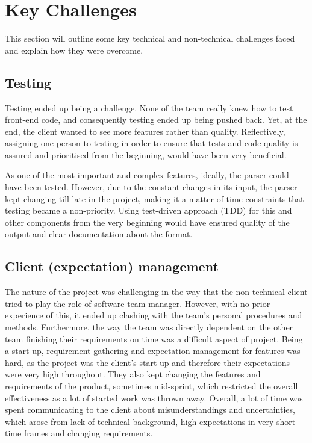 \documentclass{l3proj}
\begin{document}
\section{Key Challenges}
\label{sec:managing}

This section will outline some key technical and non-technical challenges faced and explain how they were overcome.

\subsection{Testing}
\label{subsec:testing}
Testing ended up being a challenge. None of the team really knew how to test front-end code, and consequently testing ended up being pushed back. Yet, at the end, the client wanted to see more features rather than quality. Reflectively, assigning one person to testing in order to ensure that tests and code quality is assured and prioritised from the beginning, would have been very beneficial.   

As one of the most important and complex features, ideally, the parser could have been tested. However, due to the constant changes in its input, the parser kept changing till late in the project, making it a matter of time constraints that testing became a non-priority. Using test-driven approach (TDD) for this and other components from the very beginning would have ensured quality of the output and clear documentation about the format.

\subsection{Client (expectation) management}
The nature of the project was challenging in the way that the non-technical client tried to play the role of software team manager. However, with no prior experience of this, it ended up clashing with the team's personal procedures and methods. Furthermore, the way the team was directly dependent on the other team finishing their requirements on time was a difficult aspect of project. Being a start-up, requirement gathering and expectation management for features was hard, as the project was the client’s start-up and therefore their expectations were very high throughout. They also kept changing the features and requirements of the product, sometimes mid-sprint, which restricted the overall effectiveness as a lot of started work was thrown away. Overall, a lot of time was spent communicating to the client about misunderstandings and uncertainties, which arose from lack of technical background, high expectations in very short time frames and changing requirements. 
\end{document}
